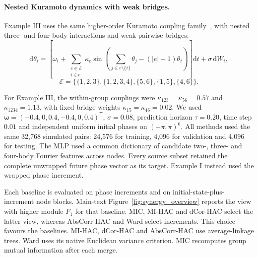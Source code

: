 \documentclass[fleqn,10pt]{wlscirep}
\newcommand{\rev}[1]{\textcolor{red}{#1}}
\begin{document}
\paragraph{Nested Kuramoto dynamics with weak bridges.}

Example III uses the same higher-order Kuramoto coupling family~\cite{Lucas2020Multiorder,Tang2022Optimizing}, with nested three- and four-body interactions and weak pairwise bridges:
\begingroup
\begin{equation}
\mathrm d\theta_i=\left[\omega_i+
\sum_{\substack{e\in\mathcal E\\ i\in e}}\kappa_e
\sin\!\left(\sum_{j\in e\setminus\{i\}}\theta_j-(|e|-1)\theta_i\right)\right]\mathrm dt+\sigma\,\mathrm dW_i,
\end{equation}
\begin{equation}
\mathcal E=\{\{1,2,3\},\{1,2,3,4\},\{5,6\},\{1,5\},\{4,6\}\}.
\end{equation}
\endgroup

For Example III, the within-group couplings were $\kappa_{123}=\kappa_{56}=0.57$ and $\kappa_{1234}=1.13$, with fixed bridge weights $\kappa_{15}=\kappa_{46}=0.02$. We used $\boldsymbol{\omega}=(-0.4,0,0.4,-0.4,0,0.4)^{\mathsf T}$, $\sigma=0.08$, prediction horizon $\tau=0.20$, time step $0.01$ and independent uniform initial phases on $(-\pi,\pi)^6$. All methods used the same 32,768 simulated pairs: 24,576 for training, 4,096 for validation and 4,096 for testing. The MLP used a common dictionary of candidate two-, three- and four-body Fourier features across nodes. Every source subset retained the complete unwrapped future phase vector as its target. Example I instead used the wrapped phase increment.

Each baseline is evaluated on phase increments and on initial-state-plus-increment node blocks. Main-text Figure~\ref{fig:synergy_overview} reports the view with higher module $F_1$ for that baseline. MIC, MI-HAC and dCor-HAC select the latter view, whereas AbsCorr-HAC and Ward select increments. This choice favours the baselines. MI-HAC, dCor-HAC and AbsCorr-HAC use average-linkage trees. Ward uses its native Euclidean variance criterion. MIC recomputes group mutual information after each merge.

\end{document}
